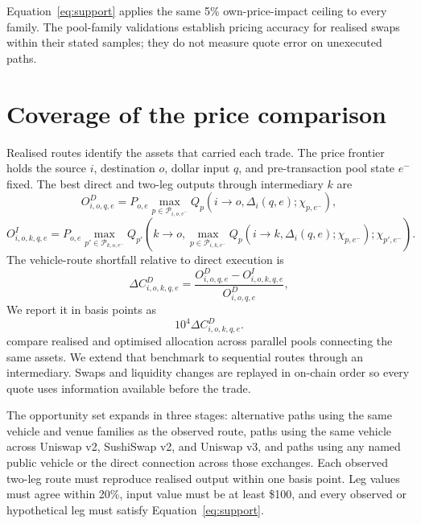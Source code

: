 Equation~\eqref{eq:support} applies the same 5\% own-price-impact ceiling to every family. The pool-family validations establish pricing accuracy for realised swaps within their stated samples; they do not measure quote error on unexecuted paths.

\section{Coverage of the price comparison}
\label{app:coverage}

Realised routes identify the assets that carried each trade. The price frontier holds the source $i$, destination $o$, dollar input $q$, and pre-transaction pool state $e^-$ fixed. The best direct and two-leg outputs through intermediary $k$ are
\begin{equation*}
O^{D}_{i,o,q,e}=P_{o,e}\max_{p\in\mathcal P_{i,o,e^-}}Q_p\!\left(i\to o,\Delta_i(q,e);\chi_{p,e^-}\right),
\end{equation*}
\begin{equation*}
O^{I}_{i,o,k,q,e}=P_{o,e}\max_{p'\in\mathcal P_{k,o,e^-}}Q_{p'}\!\left(k\to o,\max_{p\in\mathcal P_{i,k,e^-}}Q_p\!\left(i\to k,\Delta_i(q,e);\chi_{p,e^-}\right);\chi_{p',e^-}\right).
\end{equation*}
The vehicle-route shortfall relative to direct execution is
\begin{equation*}
\Delta C^{D}_{i,o,k,q,e}=\frac{O^{D}_{i,o,q,e}-O^{I}_{i,o,k,q,e}}{O^{D}_{i,o,q,e}},
\end{equation*}
We report it in basis points as
\begin{equation*}
10^{4}\Delta C^{D}_{i,o,k,q,e}.
\end{equation*}
\citet{XiMoallemi2026Routing} compare realised and optimised allocation across parallel pools connecting the same assets. We extend that benchmark to sequential routes through an intermediary. Swaps and liquidity changes are replayed in on-chain order so every quote uses information available before the trade.

The opportunity set expands in three stages: alternative paths using the same vehicle and venue families as the observed route, paths using the same vehicle across Uniswap v2, SushiSwap v2, and Uniswap v3, and paths using any named public vehicle or the direct connection across those exchanges. Each observed two-leg route must reproduce realised output within one basis point. Leg values must agree within 20\%, input value must be at least \$100, and every observed or hypothetical leg must satisfy Equation~\eqref{eq:support}.

